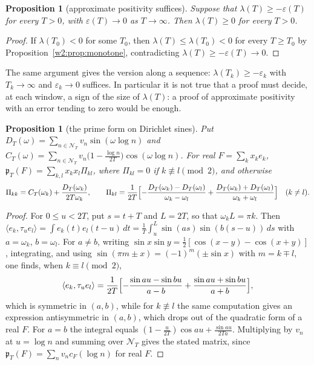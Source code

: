 \documentclass[11pt]{amsart}
\newtheorem{proposition}[theorem]{Proposition}
\theoremstyle{definition}
\theoremstyle{remark}
\numberwithin{equation}{section}
\newcommand{\cF}{c_F}                                  %
\newcommand{\NT}{\mathcal{N}_T}                        %
\newcommand{\pT}{\mathfrak{p}_T}                       %
\newcommand{\lam}{\lambda(T)}                          %
\begin{document}
\begin{proposition}[approximate positivity suffices]\label{w2:prop:soft}
Suppose that $\lam\ge-\varepsilon(T)$ for every $T>0$, with $\varepsilon(T)\to0$ as $T\to\infty$. Then $\lam\ge0$ for
every $T>0$.
\end{proposition}

\begin{proof}
If $\lambda(T_0)<0$ for some $T_0$, then $\lam\le\lambda(T_0)<0$ for every $T\ge T_0$ by
Proposition~\ref{w2:prop:monotone}, contradicting $\lam\ge-\varepsilon(T)\to0$.
\end{proof}

The same argument gives the version along a sequence: $\lambda(T_k)\ge-\varepsilon_k$ with $T_k\to\infty$ and
$\varepsilon_k\to0$ suffices. In particular it is not true that a proof must decide, at each window, a sign of the size
of $\lam$: a proof of approximate positivity with an error tending to zero would be enough.

\begin{proposition}[the prime form on Dirichlet sines]\label{w2:prop:combsine}
Put $D_T(\omega)=\sum_{n\in\NT}v_n\sin(\omega\log n)$ and
$C_T(\omega)=\sum_{n\in\NT}v_n\bigl(1-\frac{\log n}{2T}\bigr)\cos(\omega\log n)$. For real $F=\sum_kx_ke_k$,
$\pT(F)=\sum_{k,l}x_kx_l\Pi_{kl}$, where $\Pi_{kl}=0$ if $k\not\equiv l\pmod 2$, and otherwise
\[
\Pi_{kk}=C_T(\omega_k)+\frac{D_T(\omega_k)}{2T\omega_k},\qquad
\Pi_{kl}=\frac1{2T}\Bigl[-\frac{D_T(\omega_k)-D_T(\omega_l)}{\omega_k-\omega_l}+\frac{D_T(\omega_k)+D_T(\omega_l)}{\omega_k+\omega_l}\Bigr]
\quad(k\ne l).
\]
\end{proposition}

\begin{proof}
For $0\le u<2T$, put $s=t+T$ and $L=2T$, so that $\omega_kL=\pi k$. Then
$\langle e_k,\tau_ue_l\rangle=\int e_k(t)e_l(t-u)\,dt=\frac1T\int_u^L\sin(as)\sin(b(s-u))\,ds$ with $a=\omega_k$,
$b=\omega_l$. For $a\ne b$, writing $\sin x\sin y=\frac12[\cos(x-y)-\cos(x+y)]$, integrating, and using
$\sin(\pi m\pm x)=(-1)^m(\pm\sin x)$ with $m=k\mp l$, one finds, when $k\equiv l\pmod2$,
\[
\langle e_k,\tau_ue_l\rangle=\frac1{2T}\Bigl[-\frac{\sin au-\sin bu}{a-b}+\frac{\sin au+\sin bu}{a+b}\Bigr],
\]
which is symmetric in $(a,b)$, while for $k\not\equiv l$ the same computation gives an expression antisymmetric in
$(a,b)$, which drops out of the quadratic form of a real $F$. For $a=b$ the integral equals
$(1-\frac u{2T})\cos au+\frac{\sin au}{2Ta}$. Multiplying by $v_n$ at $u=\log n$ and summing over $\NT$ gives the
stated matrix, since $\pT(F)=\sum_nv_n\cF(\log n)$ for real $F$.
\end{proof}
\end{document}
